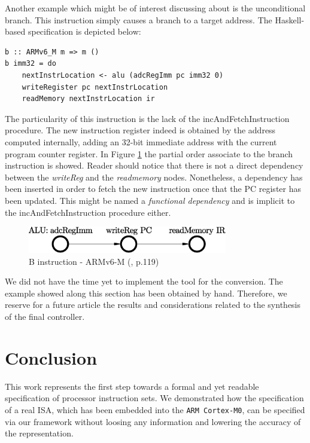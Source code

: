 \documentclass[conference]{IEEEtran}
\begin{document}
Another example which might be of interest discussing about is the unconditional branch. This
instruction simply causes a branch to a target address. The Haskell-based specification is
depicted below:\\

\begin{lstlisting}[caption=B instruction - Haskell-based specification,
frame=single, label=lis:and]
b :: ARMv6_M m => m ()
b imm32 = do
    nextInstrLocation <- alu (adcRegImm pc imm32 0)
    writeRegister pc nextInstrLocation
    readMemory nextInstrLocation ir
\end{lstlisting}

\noindent
The particularity of this instruction is the lack of the incAndFetchInstruction procedure.
The new instruction register indeed is obtained by the address computed internally, adding an
32-bit immediate address with the current program counter register. In Figure \ref{fig:bPO}
the partial order associate to the branch instruction is showed. Reader should notice that
there is not a direct dependency between the \textit{writeReg} and the \textit{readmemory}
nodes. Nonetheless, a dependency has been inserted in order to fetch the new instruction once
that the PC register has been updated. This might be named a \textit{functional dependency}
and is implicit to the incAndFetchInstruction procedure either.

\begin{figure}[ht!]
\begin{center}
	\includegraphics[width=8.7cm]{IMG/b.eps}
	\caption{B instruction - ARMv6-M (\cite{armManual}, p.119)}
	\label{fig:bPO}
\end{center}
\end{figure}

We did not have the time yet to implement the tool for the conversion.
The example showed along this section has been obtained by hand. Therefore, we reserve for a
future article the results and considerations related to the synthesis of the final
controller.


\section{Conclusion}
\label{sec:conclusion}
This work represents the first step towards a formal and yet readable specification of
processor instruction sets. We demonstrated how the specification of a real ISA, which has
been embedded into the \verb|ARM Cortex-M0|, can be specified via our framework without
loosing any information and lowering the accuracy of the representation.
\end{document}
